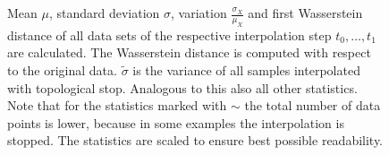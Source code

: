 \begin{figure}
\caption{Mean $\mu$, standard deviation $\sigma$, variation $\frac{\sigma_X}{\mu_X}$ and first Wasserstein distance of all data sets of the respective interpolation step $t_0, \ldots, t_1$ are calculated. The Wasserstein distance is computed with respect to the original data. $\tilde{\sigma}$ is the variance of all samples interpolated with topological stop. Analogous to this also all other statistics. Note that for the statistics marked with $\sim$ the total number of data points is lower, because in some examples the interpolation is stopped. The statistics are scaled to ensure best possible readability.}
\label{fig:evaluation}
\end{figure}
